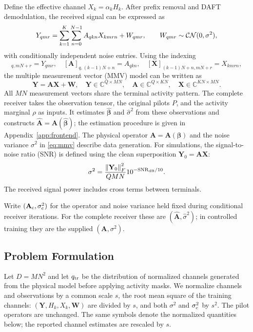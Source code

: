 Define the effective channel $X_k=\alpha_kH_k$.
After prefix removal and DAFT demodulation, the received signal can be expressed as
\begin{equation}
 Y_{qmr}=\sum_{k=1}^K\sum_{n=0}^{N-1}A_{qkn}X_{kmrn}+W_{qmr},
 \qquad W_{qmr}\sim\mathcal{CN}(0,\sigma^2),
 \label{eq:observation-tensor}
\end{equation}
with conditionally independent noise entries.
Using the indexing
\begin{equation}
 [\mathbf Y]_{q,mN+r}=Y_{qmr},\quad
 [\mathbf A]_{q,(k-1)N+n}=A_{qkn},\quad
 [\mathbf X]_{(k-1)N+n,mN+r}=X_{kmrn},
 \label{eq:mmv-indexing}
\end{equation}
the multiple measurement vector (MMV) model can be written as
\begin{equation}
 \mathbf Y=\mathbf A\mathbf X+\mathbf W,\quad
 \mathbf Y\in\mathbb C^{Q\times MN},\quad
 \mathbf A\in\mathbb C^{Q\times KN},\quad
 \mathbf X\in\mathbb C^{KN\times MN}.
 \label{eq:mmv}
\end{equation}
All $MN$ measurement vectors share the terminal activity pattern.
The complete receiver takes the observation tensor, the original pilots $P$,
and the activity marginal $\rho$ as inputs. It estimates
$\widehat{\bm\beta}$ and $\widehat\sigma^2$ from these observations
and constructs $\widehat{\mathbf A}=\mathbf A(\widehat{\bm\beta})$;
the estimation procedure is given in Appendix~\ref{app:frontend}.
The physical operator $\mathbf A=\mathbf A(\bm\beta)$ and the noise
variance $\sigma^2$ in \eqref{eq:mmv} describe data generation.
For simulations, the signal-to-noise ratio (SNR)
is defined using the clean superposition $\mathbf Y_0=\mathbf A\mathbf X$:
\begin{equation}
 \sigma^2=\frac{\left\lVert\mathbf Y_0\right\rVert_F^2}{QMN}
 10^{-\mathrm{SNR}_{\rm dB}/10}.
 \label{eq:snr}
\end{equation}
The received signal power includes cross terms between terminals.

Write $(\mathbf A_{\rm c},\sigma_{\rm c}^2)$ for the operator and noise
variance held fixed during conditional receiver iterations. For the
complete receiver these are $(\widehat{\mathbf A},\widehat\sigma^2)$;
in controlled training they are the supplied $(\mathbf A,\sigma^2)$.

\subsection{Problem Formulation}

Let $D=MN^2$ and let $q_{\rm tr}$ be the distribution of normalized channels
generated from the physical model before applying activity masks.
We normalize channels and observations by a common scale $s$,
the root mean square of the training channels:
$(\mathbf Y,H_k,X_k,\mathbf W)$ are divided by $s$, and both
$\sigma^2$ and $\sigma_{\rm c}^2$ by $s^2$. The pilot operators are
unchanged. The same symbols denote the normalized quantities below;
the reported channel estimates are rescaled by $s$.

